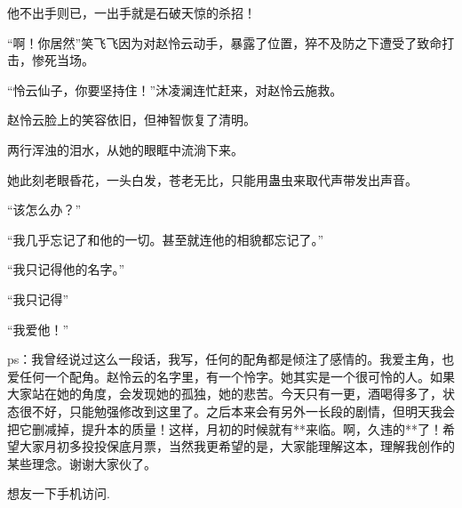 \begin{this_body}
他不出手则已，一出手就是石破天惊的杀招！

“啊！你居然”笑飞飞因为对赵怜云动手，暴露了位置，猝不及防之下遭受了致命打击，惨死当场。

“怜云仙子，你要坚持住！”沐凌澜连忙赶来，对赵怜云施救。

赵怜云脸上的笑容依旧，但神智恢复了清明。

两行浑浊的泪水，从她的眼眶中流淌下来。

她此刻老眼昏花，一头白发，苍老无比，只能用蛊虫来取代声带发出声音。

“该怎么办？”

“我几乎忘记了和他的一切。甚至就连他的相貌都忘记了。”

“我只记得他的名字。”

“我只记得”

“我爱他！”

ps：我曾经说过这么一段话，我写，任何的配角都是倾注了感情的。我爱主角，也爱任何一个配角。赵怜云的名字里，有一个怜字。她其实是一个很可怜的人。如果大家站在她的角度，会发现她的孤独，她的悲苦。今天只有一更，酒喝得多了，状态很不好，只能勉强修改到这里了。之后本来会有另外一长段的剧情，但明天我会把它删减掉，提升本的质量！这样，月初的时候就有**来临。啊，久违的**了！希望大家月初多投投保底月票，当然我更希望的是，大家能理解这本，理解我创作的某些理念。谢谢大家伙了。

想友一下手机访问.

\end{this_body}

